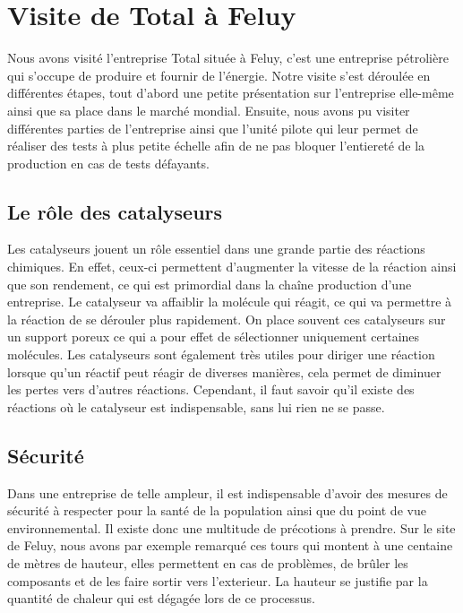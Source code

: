 \documentclass[10pt,a4paper]{article}
\begin{document}
\section{Visite de Total à Feluy}

Nous avons visité l'entreprise Total située à Feluy, c'est une entreprise pétrolière qui s'occupe de produire et fournir de l'énergie. Notre visite s'est déroulée en différentes étapes, tout d'abord une petite présentation sur l'entreprise elle-même ainsi que sa place dans le marché mondial. Ensuite, nous avons pu visiter différentes parties de l'entreprise ainsi que l'unité pilote qui leur permet de réaliser des tests à plus petite échelle afin de ne pas bloquer l'entiereté de la production en cas de tests défayants.

\subsection{Le rôle des catalyseurs}

Les catalyseurs jouent un rôle essentiel dans une grande partie des réactions chimiques. En effet, ceux-ci permettent d'augmenter la vitesse de la réaction ainsi que son rendement, ce qui est primordial dans la chaîne production d'une entreprise. Le catalyseur va affaiblir la molécule qui réagit, ce qui va permettre à la réaction de se dérouler plus rapidement.
On place souvent ces catalyseurs sur un support poreux ce qui a pour effet de sélectionner uniquement certaines molécules. Les catalyseurs sont également très utiles pour diriger une réaction lorsque qu'un réactif peut réagir de diverses manières, cela permet de diminuer les pertes vers d'autres réactions. Cependant, il faut savoir qu'il existe des réactions où le catalyseur est indispensable, sans lui rien ne se passe.

\subsection{Sécurité}

Dans une entreprise de telle ampleur, il est indispensable d'avoir des mesures de sécurité à respecter pour la santé de la population ainsi que du point de vue environnemental. Il existe donc une multitude de précotions à prendre. Sur le site de Feluy, nous avons par exemple remarqué ces tours qui montent à une centaine de mètres de hauteur, elles permettent en cas de problèmes, de brûler les composants et de les faire sortir vers l'exterieur. La hauteur se justifie par la quantité de chaleur qui est dégagée lors de ce processus.
\end{document}
